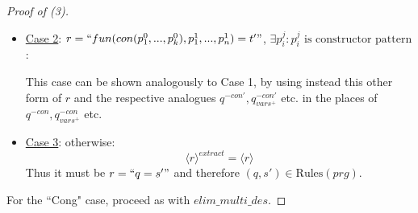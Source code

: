 \documentclass[11pt]{article} %
\begin{document}
\begin{proof}[Proof of (3)]
\begin{enumerate}
\begin{itemize}
\begin{enumerate}

\item $n_c = 1$:
\begin{equation*}
\langle `` q' = t' ", H \rangle^{extract} = \langle `` q'^{-con} = hname (q'^{-con}_{vars^+}) ", \{\big\langle hsig, heqn \big\rangle\} \cup H \rangle^{extract}
\end{equation*}
with $hname, hsig, heqn$ as in the definition of $extract$. Since $q'$ contains only one constructor pattern, $q'^{-con}$ contains no constructor pattern. It follows that:
\begin{equation*}
\langle `` q' = t' ", H \rangle^{extract} = \big\langle `` q'^{-con} = hname (q'^{-con}_{vars^+}) ", \{\big\langle hsig, heqn \big\rangle\} \cup H \big\rangle
\end{equation*}
 Neither of the two equations outside of $H$ in $\langle r, H \rangle^{extract}$ is $`` q = s' "$, since they both contain function names not present in $prg$.

\item $n_c = n'_c + 1$, $n'_c \geq 0$:
\begin{equation*}
\langle `` q' = t' ", H \rangle^{extract} = \langle `` q'^{-con} = hname (q'^{-con}_{vars^+}) ", \{\big\langle hsig, heqn \big\rangle\} \cup H \rangle^{extract}
\end{equation*}
with $hname, hsig, heqn$ as in the definition of $extract$. Since $q'^{-con}$ contains one less constructor pattern than $q'$, it contains $n'_c$ such patterns. Applying the induction hypothesis we have that $\langle r, H \rangle^{extract}$ doesn't contain $`` q = s' "$ outside of $\{ \big\langle hsig, heqn \big\rangle \} \cup H$. The only remaining equation outside of $H$ that could be $`` q = s' "$ is defined by $heqn$ to contain a function name not present in $prg$. Thus this equation can't be $`` q = s' "$, either.

\end{enumerate}

\item \underline{Case 2}:  $r = `` fun(con(p^0_1, ..., p^0_k), p^1_1, ..., p^1_n) = t' " $, $\exists p^j_i: p^j_i \textrm{ is constructor pattern}$:

This case can be shown analogously to Case 1, by using instead this other form of $r$ and the respective analogues $q^{-con'}, q^{-con'}_{vars^+}$ etc. in the places of $q^{-con}, q^{-con}_{vars^+}$ etc.

\item \underline{Case 3}: otherwise:
\begin{equation*}
\langle r \rangle^{extract} = \big\langle r \big\rangle
\end{equation*}
Thus it must be $r = `` q = s' "$ and therefore $(q, s') \in \textrm{Rules}(prg)$.

\end{itemize}

\end{enumerate}

For the ``Cong" case, proceed as with $elim\_multi\_des$.

\end{proof}
\end{document}
